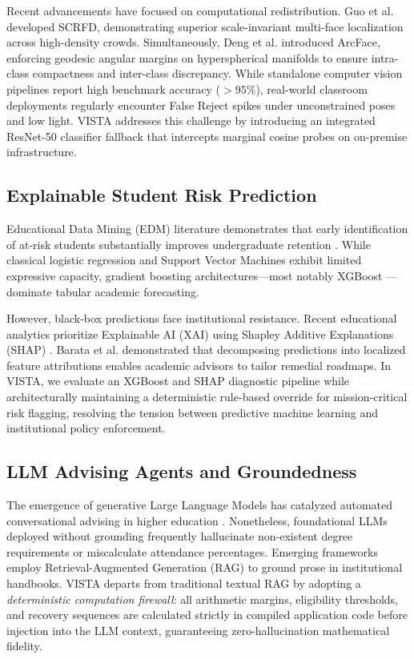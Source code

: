 \documentclass[conference]{IEEEtran}
\begin{document}
Recent advancements have focused on computational redistribution. Guo et al. \cite{guo2022sample} developed SCRFD, demonstrating superior scale-invariant multi-face localization across high-density crowds. Simultaneously, Deng et al. \cite{deng2019arcface} introduced ArcFace, enforcing geodesic angular margins on hyperspherical manifolds to ensure intra-class compactness and inter-class discrepancy. While standalone computer vision pipelines report high benchmark accuracy ($>95\%$), real-world classroom deployments regularly encounter False Reject spikes under unconstrained poses and low light. VISTA addresses this challenge by introducing an integrated ResNet-50 classifier fallback that intercepts marginal cosine probes on on-premise infrastructure.

\subsection{Explainable Student Risk Prediction}
Educational Data Mining (EDM) literature demonstrates that early identification of at-risk students substantially improves undergraduate retention \cite{gardner2018student}. While classical logistic regression and Support Vector Machines exhibit limited expressive capacity, gradient boosting architectures—most notably XGBoost \cite{chen2016xgboost}—dominate tabular academic forecasting. 

However, black-box predictions face institutional resistance. Recent educational analytics prioritize Explainable AI (XAI) using Shapley Additive Explanations (SHAP) \cite{lundberg2017unified, barata2023predicting}. Barata et al. demonstrated that decomposing predictions into localized feature attributions enables academic advisors to tailor remedial roadmaps. In VISTA, we evaluate an XGBoost and SHAP diagnostic pipeline while architecturally maintaining a deterministic rule-based override for mission-critical risk flagging, resolving the tension between predictive machine learning and institutional policy enforcement.

\subsection{LLM Advising Agents and Groundedness}
The emergence of generative Large Language Models has catalyzed automated conversational advising in higher education \cite{lee2024exploring}. Nonetheless, foundational LLMs deployed without grounding frequently hallucinate non-existent degree requirements or miscalculate attendance percentages. Emerging frameworks employ Retrieval-Augmented Generation (RAG) to ground prose in institutional handbooks. VISTA departs from traditional textual RAG by adopting a \textit{deterministic computation firewall}: all arithmetic margins, eligibility thresholds, and recovery sequences are calculated strictly in compiled application code before injection into the LLM context, guaranteeing zero-hallucination mathematical fidelity.
\end{document}
